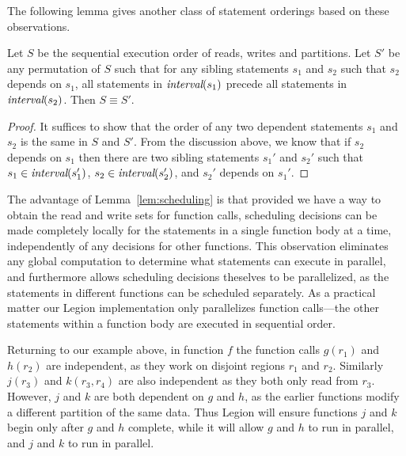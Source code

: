 The following lemma gives another class of statement orderings based on these observations.
\begin{lemma}
\rm
\label{lem:scheduling}
Let $S$ be the sequential execution order of reads, writes and partitions.  Let $S'$ be any permutation of $S$ such that
for any sibling statements $s_1$ and $s_2$ such that $s_2$ depends on $s_1$, all statements in $\mbox{\em interval}(s_1)$ precede
all statements in $\mbox{\em interval}(s_2)$.  Then $S \equiv S'$.
\end{lemma}
\begin{proof}
It suffices to show that the order of any two dependent statements $s_1$ and $s_2$ is the same in $S$ and $S'$.
From the discussion above, we know that if $s_2$ depends on $s_1$ then there are two sibling statements $s_1'$ and $s_2'$
such that $s_1 \in \mbox{\em interval}(s_1')$, $s_2 \in \mbox{\em interval}(s_2')$, and $s_2'$ depends
on $s_1'$.
\end{proof}
The advantage of Lemma~\ref{lem:scheduling} is that provided we have
a way to obtain the read and write sets for function calls, scheduling
decisions can be made completely locally for the statements in a
single function body at a time, independently of any decisions for
other functions.  This observation eliminates any global
computation to determine what statements can execute in parallel, and
furthermore allows scheduling decisions theselves to be parallelized, as the statements
in different functions can be scheduled separately.  As a practical matter
our Legion implementation only parallelizes function calls---the other
statements within a function body are executed in sequential
order.

Returning to our example above, in function $f$ the function calls
$g(r_1)$ and $h(r_2)$ are independent, as they work on disjoint
regions $r_1$ and $r_2$.  Similarly $j(r_3)$ and $k(r_3,r_4)$ are
also independent as they both only read from $r_3$.  However, $j$ and $k$
are both dependent on $g$ and $h$, as the earlier functions modify a different
partition of the same data.  Thus Legion will ensure functions $j$ and $k$
begin only after $g$ and $h$ complete, while it will allow $g$ and $h$
to run in parallel, and $j$ and $k$ to run in parallel.






   













